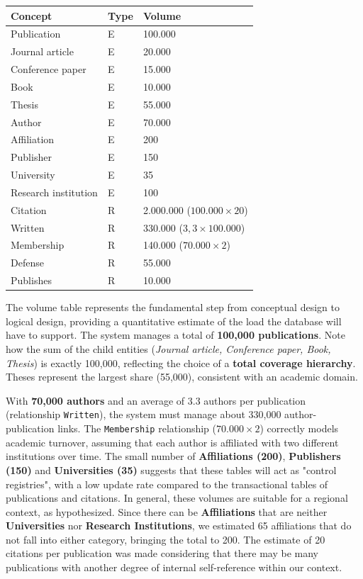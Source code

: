 \documentclass[a4paper,12pt]{article}
\begin{document}
\begin{tabularx}{\textwidth}{X X X}
\toprule
\textbf{Concept} & \textbf{Type} & \textbf{Volume} \\
\midrule
Publication & E & 100.000 \\
Journal article & E & 20.000 \\
Conference paper & E & 15.000 \\
Book & E & 10.000 \\
Thesis & E & 55.000 \\
Author & E & 70.000 \\
Affiliation & E & 200 \\
Publisher & E & 150 \\
University & E & 35 \\
Research institution & E & 100 \\
\midrule
Citation & R & 2.000.000 ($100.000 \times 20$) \\
Written & R & 330.000 ($3,3 \times 100.000$) \\
Membership & R & 140.000 ($70.000 \times 2$) \\
Defense & R & 55.000 \\
Publishes & R & 10.000 \\
\bottomrule
\end{tabularx}

\medskip

The volume table represents the fundamental step from conceptual design to logical design, providing a quantitative estimate of the load the database will have to support. The system manages a total of \textbf{100,000 publications}. Note how the sum of the child entities (\textit{Journal article, Conference paper, Book, Thesis}) is exactly 100,000, reflecting the choice of a \textbf{total coverage hierarchy}. Theses represent the largest share (55,000), consistent with an academic domain.

With \textbf{70,000 authors} and an average of 3.3 authors per publication (relationship \texttt{Written}), the system must manage about 330,000 author-publication links. The \texttt{Membership} relationship ($70.000 \times 2$) correctly models academic turnover, assuming that each author is affiliated with two different institutions over time.
The small number of \textbf{Affiliations (200)}, \textbf{Publishers (150)} and \textbf{Universities (35)} suggests that these tables will act as "control registries", with a low update rate compared to the transactional tables of publications and citations. In general, these volumes are suitable for a regional context, as hypothesized. Since there can be \textbf{Affiliations} that are neither \textbf{Universities} nor \textbf{Research Institutions}, we estimated 65 affiliations that do not fall into either category, bringing the total to 200.
The estimate of 20 citations per publication was made considering that there may be many publications with another degree of internal self-reference within our context.
\end{document}
